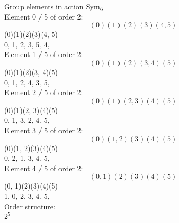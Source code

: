 Group elements in action ${\rm Sym}_{6}$\\
Element     0 / 5 of order 2:
$$
(0)(1)(2)(3)(4, 5)$$
(0)(1)(2)(3)(4, 5)\\
0, 1, 2, 3, 5, 4, \\
Element     1 / 5 of order 2:
$$
(0)(1)(2)(3, 4)(5)$$
(0)(1)(2)(3, 4)(5)\\
0, 1, 2, 4, 3, 5, \\
Element     2 / 5 of order 2:
$$
(0)(1)(2, 3)(4)(5)$$
(0)(1)(2, 3)(4)(5)\\
0, 1, 3, 2, 4, 5, \\
Element     3 / 5 of order 2:
$$
(0)(1, 2)(3)(4)(5)$$
(0)(1, 2)(3)(4)(5)\\
0, 2, 1, 3, 4, 5, \\
Element     4 / 5 of order 2:
$$
(0, 1)(2)(3)(4)(5)$$
(0, 1)(2)(3)(4)(5)\\
1, 0, 2, 3, 4, 5, \\
Order structure:\\
$
2^5 $
\\
